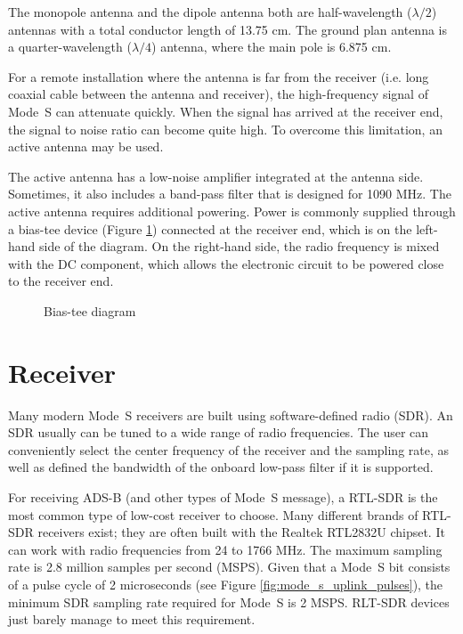The monopole antenna and the dipole antenna both are half-wavelength ($\lambda/2$) antennas with a total conductor length of 13.75 cm. The ground plan antenna is a quarter-wavelength ($\lambda/4$) antenna, where the main pole is 6.875 cm.

For a remote installation where the antenna is far from the receiver (i.e. long coaxial cable between the antenna and receiver), the high-frequency signal of Mode~S can attenuate quickly. When the signal has arrived at the receiver end, the signal to noise ratio can become quite high. To overcome this limitation, an active antenna may be used.

The active antenna has a low-noise amplifier integrated at the antenna side. Sometimes, it also includes a band-pass filter that is designed for 1090 MHz. The active antenna requires additional powering. Power is commonly supplied through a bias-tee device (Figure \ref{fig:biastee}) connected at the receiver end, which is on the left-hand side of the diagram. On the right-hand side, the radio frequency is mixed with the DC component, which allows the electronic circuit to be powered close to the receiver end.

\begin{figure}[ht]
  \centering
  
  \caption{Bias-tee diagram}
  \label{fig:biastee}
\end{figure}


\section{Receiver}

Many modern Mode~S receivers are built using software-defined radio (SDR). An SDR usually can be tuned to a wide range of radio frequencies. The user can conveniently select the center frequency of the receiver and the sampling rate, as well as defined the bandwidth of the onboard low-pass filter if it is supported.

For receiving ADS-B (and other types of Mode~S message), a RTL-SDR is the most common type of low-cost receiver to choose. Many different brands of RTL-SDR receivers exist; they are often built with the Realtek RTL2832U chipset. It can work with radio frequencies from 24 to 1766 MHz. The maximum sampling rate is 2.8 million samples per second (MSPS). Given that a Mode~S bit consists of a pulse cycle of 2 microseconds (see Figure \ref{fig:mode_s_uplink_pulses}), the minimum SDR sampling rate required for Mode~S is 2 MSPS. RLT-SDR devices just barely manage to meet this requirement.

